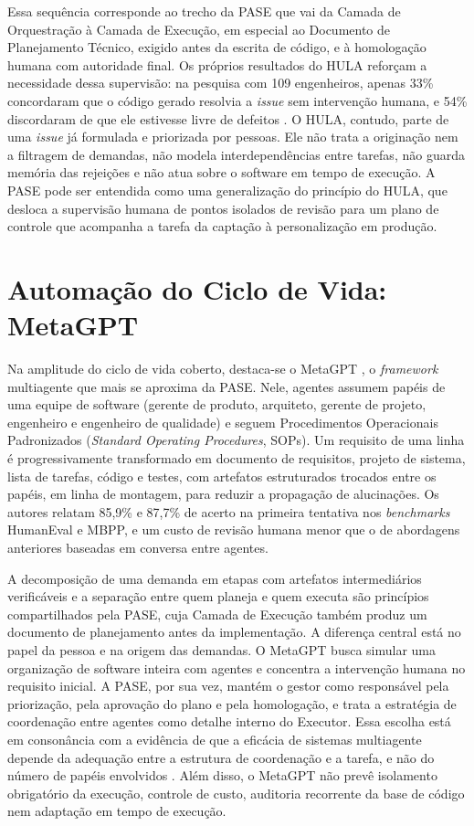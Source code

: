 Essa sequência corresponde ao trecho da PASE que vai da Camada de Orquestração à Camada de Execução, em especial ao Documento de Planejamento Técnico, exigido antes da escrita de código, e à homologação humana com autoridade final. Os próprios resultados do HULA reforçam a necessidade dessa supervisão: na pesquisa com 109 engenheiros, apenas 33\% concordaram que o código gerado resolvia a \textit{issue} sem intervenção humana, e 54\% discordaram de que ele estivesse livre de defeitos \cite{takerngsaksiri2025hula}. O HULA, contudo, parte de uma \textit{issue} já formulada e priorizada por pessoas. Ele não trata a originação nem a filtragem de demandas, não modela interdependências entre tarefas, não guarda memória das rejeições e não atua sobre o software em tempo de execução. A PASE pode ser entendida como uma generalização do princípio do HULA, que desloca a supervisão humana de pontos isolados de revisão para um plano de controle que acompanha a tarefa da captação à personalização em produção.

\section{Automação do Ciclo de Vida: MetaGPT}\label{sec:3.3}

Na amplitude do ciclo de vida coberto, destaca-se o MetaGPT \cite{hong2024metagpt}, o \textit{framework} multiagente que mais se aproxima da PASE. Nele, agentes assumem papéis de uma equipe de software (gerente de produto, arquiteto, gerente de projeto, engenheiro e engenheiro de qualidade) e seguem Procedimentos Operacionais Padronizados (\textit{Standard Operating Procedures}, SOPs). Um requisito de uma linha é progressivamente transformado em documento de requisitos, projeto de sistema, lista de tarefas, código e testes, com artefatos estruturados trocados entre os papéis, em linha de montagem, para reduzir a propagação de alucinações. Os autores relatam 85,9\% e 87,7\% de acerto na primeira tentativa nos \textit{benchmarks} HumanEval e MBPP, e um custo de revisão humana menor que o de abordagens anteriores baseadas em conversa entre agentes.

A decomposição de uma demanda em etapas com artefatos intermediários verificáveis e a separação entre quem planeja e quem executa são princípios compartilhados pela PASE, cuja Camada de Execução também produz um documento de planejamento antes da implementação. A diferença central está no papel da pessoa e na origem das demandas. O MetaGPT busca simular uma organização de software inteira com agentes e concentra a intervenção humana no requisito inicial. A PASE, por sua vez, mantém o gestor como responsável pela priorização, pela aprovação do plano e pela homologação, e trata a estratégia de coordenação entre agentes como detalhe interno do Executor. Essa escolha está em consonância com a evidência de que a eficácia de sistemas multiagente depende da adequação entre a estrutura de coordenação e a tarefa, e não do número de papéis envolvidos \cite{kim2026scaling}. Além disso, o MetaGPT não prevê isolamento obrigatório da execução, controle de custo, auditoria recorrente da base de código nem adaptação em tempo de execução.

